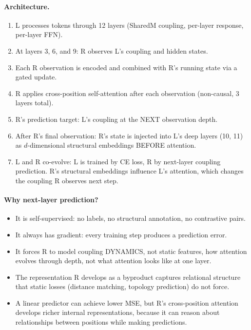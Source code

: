 \documentclass[11pt, a4paper]{article}
\theoremstyle{plain}
\theoremstyle{definition}
\theoremstyle{remark}
\begin{document}
\paragraph{Architecture.}
\begin{enumerate}[nosep]
\item L processes tokens through 12 layers (SharedM coupling, per-layer response, per-layer FFN).
\item At layers 3, 6, and 9: R observes L's coupling and hidden states.
\item Each R observation is encoded and combined with R's running state via a gated update.
\item R applies cross-position self-attention after each observation (non-causal, 3 layers total).
\item R's prediction target: L's coupling at the NEXT observation depth.
\item After R's final observation: R's state is injected into L's deep layers (10, 11) as $d$-dimensional structural embeddings BEFORE attention.
\item L and R co-evolve: L is trained by CE loss, R by next-layer coupling prediction. R's structural embeddings influence L's attention, which changes the coupling R observes next step.
\end{enumerate}

\paragraph{Why next-layer prediction?}
\begin{itemize}[nosep]
\item It is self-supervised: no labels, no structural annotation, no contrastive pairs.
\item It always has gradient: every training step produces a prediction error.
\item It forces R to model coupling DYNAMICS, not static features, how attention evolves through depth, not what attention looks like at one layer.
\item The representation R develops as a byproduct captures relational structure that static losses (distance matching, topology prediction) do not force.
\item A linear predictor can achieve lower MSE, but R's cross-position attention develops richer internal representations, because it can reason about relationships between positions while making predictions.
\end{itemize}
\end{document}

